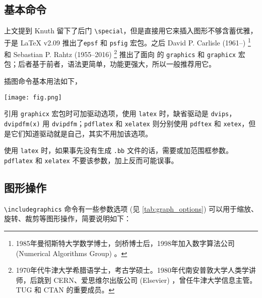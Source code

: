 \subsection{基本命令}

上文提到 Knuth 留下了后门 \verb|\special|，但是直接用它来插入图形不够含蓄优雅，于是 \LaTeX{} v2.09 推出了\texttt{epsf} 和 \texttt{psfig} 宏包。之后 David P. Carlisle (1961--)\indexCarlisle{} \footnote{1985年曼彻斯特大学数学博士，剑桥博士后，1998年加入数字算法公司 (Numerical Algorithms Group) 。} 和 Sebastian P. Rahtz (1955--2016)\indexRahtz{} \footnote{1970年代牛津大学希腊语学士，考古学硕士。1980年代南安普敦大学人类学讲师，后跳到 CERN、爱思维尔出版公司 (Elsevier) ，曾任牛津大学信息主管。TUG 和 CTAN 的重要成员。} 推出了面向 \LaTeXe 的 \texttt{graphics} 和 \texttt{graphicx} 宏包；后者基于前者，语法更简单，功能更强大，所以一般推荐用它。

插图命令基本用法如下，

\begin{Code}[]
\usepackage[dvipdfm]{graphicx}
\texttt{[image: fig.png]}
\end{Code}

引用 \texttt{graphicx} 宏包时可加驱动选项，使用 \texttt{latex} 时，缺省驱动是 \texttt{dvips}，\texttt{dvipdfm(x)} 用 \texttt{dvipdfm}；\texttt{pdflatex} 和 \texttt{xelatex} 则分别使用 \texttt{pdftex} 和 \texttt{xetex}，但是它们知道驱动就是自己，其实不用加该选项。

使用 \texttt{latex} 时，如果事先没有生成 \texttt{.bb} 文件的话，需要或加范围框参数。\texttt{pdflatex} 和 \texttt{xelatex} 不要该参数，加上反而可能误事。

\subsection{图形操作}

\verb|\includegraphics| 命令有一些参数选项 (见 \autoref{tab:graph_options}) 可以用于缩放、旋转、裁剪等图形操作，简要说明如下：

